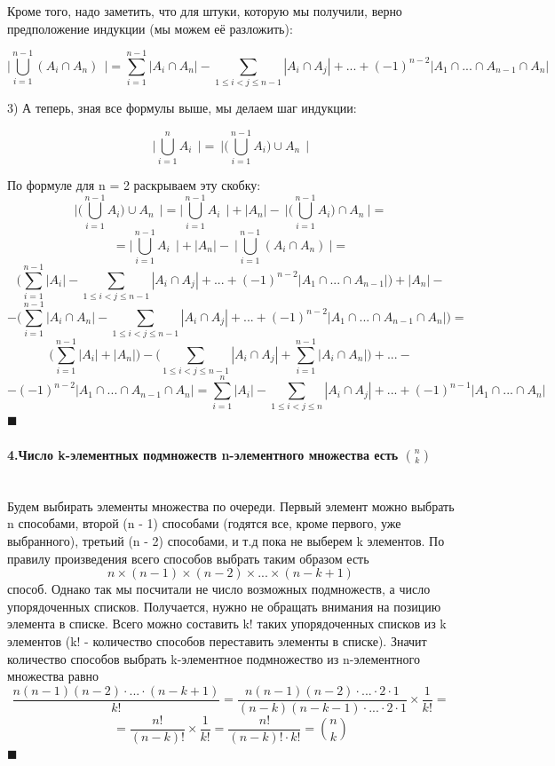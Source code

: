 \documentclass[a4paper, 12pt]{article}
\newcommand{\parag}[1]{\paragraph{#1}\mbox{}\\}
\begin{document}
Кроме того, надо заметить, что для штуки, которую мы получили, верно предположение индукции (мы можем её разложить):

\[
    \Big|\underset{i = 1}{\overset{n - 1}{\bigcup}}(A_{i} \cap A_{n})\ \ \Big| =
    \underset{i=1}{\overset{n - 1}{\sum}}|A_{i} \cap A_{n}| -
    \underset{1 \leqslant i < j \leqslant n - 1}{\sum} |A_{i} \cap A_{j}|+
    ... +
    (-1)^{n-2} |A_{1} \cap ... \cap A_{n-1} \cap A_{n}|
\]

3) А теперь, зная все формулы выше, мы делаем шаг индукции:

\[
    \Big|\underset{i = 1}{\overset{n}{\bigcup}}A_{i}\ \ \Big| =\
    \Big|\Big(\underset{i = 1}{\overset{n - 1}{\bigcup}}A_{i}\Big)\cup A_{n}\ \ \Big|
\]

По формуле для n = 2 раскрываем эту скобку:
\[
    \Big|\Big(\underset{i = 1}{\overset{n - 1}{\bigcup}}A_{i}\Big)\cup A_{n}\ \ \Big| =
    \Big|\underset{i = 1}{\overset{n-1}{\bigcup}}A_{i}\ \ \Big| +
    |A_{n}| -\ 
    \Big|\Big(\overset{n-1}{\underset{i=1}{\bigcup}}A_{i}\Big) \cap A_{n}\ \Big| =
\]
\[
    = \Big|\underset{i = 1}{\overset{n-1}{\bigcup}}A_{i}\ \ \Big| +
    |A_{n}| -\ 
    \Big|\overset{n-1}{\underset{i=1}{\bigcup}}(A_{i} \cap A_{n})\ \Big| =
\]
\[
    \Bigg( \underset{i=1}{\overset{n - 1}{\sum}}|A_{i}| -
    \underset{1 \leqslant i < j \leqslant n - 1}{\sum} |A_{i} \cap A_{j}|+
    ... +
    (-1)^{n-2} |A_{1} \cap ... \cap A_{n-1}| \Bigg) + |A_{n}| -
\]
\[
    - \Bigg( \underset{i=1}{\overset{n - 1}{\sum}}|A_{i} \cap A_{n}| -
    \underset{1 \leqslant i < j \leqslant n - 1}{\sum} |A_{i} \cap A_{j}|+
    ... +
    (-1)^{n-2} |A_{1} \cap ... \cap A_{n-1} \cap A_{n}| \Bigg) =
\]
\[
    \Big(\underset{i=1}{\overset{n - 1}{\sum}}|A_{i}| + |A_{n}| \Big) -
    \Bigg( \underset{1 \leqslant i < j \leqslant n - 1}{\sum} |A_{i} \cap A_{j}| +  \underset{i=1}{\overset{n - 1}{\sum}}|A_{i} \cap A_{n}| \Bigg) + ... -
\]
\[
    -(-1)^{n-2} |A_{1} \cap ... \cap A_{n-1} \cap A_{n}| = \underset{i=1}{\overset{n}{\sum}}|A_{i}| -
    \underset{1 \leqslant i < j \leqslant n}{\sum} |A_{i} \cap A_{j}|+
    ... +
    (-1)^{n-1} |A_{1} \cap ... \cap A_{n}|
\]
$\blacksquare$

\parag{4.Число k-элементных подмножеств n-элементного множества есть ${n \choose k}$}
Будем выбирать элементы множества по очереди. Первый элемент можно выбрать n способами, второй (n - 1) способами (годятся все, кроме первого, уже выбранного), третьий (n - 2) способами, и т.д пока не выберем k элементов. По правилу произведения всего способов выбрать таким образом есть
\[
    n \times (n - 1) \times (n - 2) \times ... \times (n - k + 1)
\]
способ. Однако так мы посчитали не число возможных подмножеств, а число упорядоченных списков. Получается, нужно не обращать внимания на позицию элемента в списке. Всего можно составить k! таких упорядоченных списков из k элементов (k! - количество способов переставить элементы в списке). Значит количество способов выбрать k-элементное подмножество из n-элементного множества равно 
\[
    \frac{n(n-1)(n-2)\cdot...\cdot(n-k+1)}{k!} =
    \frac{n(n-1)(n-2)\cdot...\cdot2\cdot1}{(n-k)(n-k-1)\cdot...\cdot2\cdot1} \times \frac{1}{k!} = 
\]
\[
    = \frac{n!}{(n-k)!} \times \frac{1}{k!} = \frac{n!}{(n-k)!\cdot k!} = {n \choose k}
\]
$\blacksquare$
\end{document}
